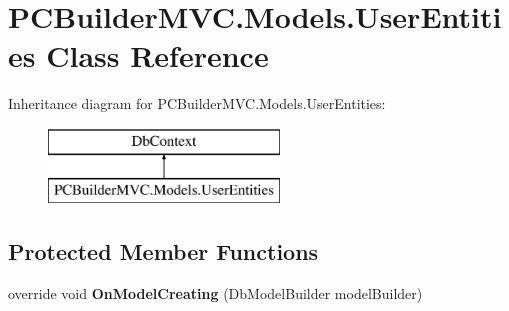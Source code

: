 \hypertarget{class_p_c_builder_m_v_c_1_1_models_1_1_user_entities}{}\section{P\+C\+Builder\+M\+V\+C.\+Models.\+User\+Entities Class Reference}
\label{class_p_c_builder_m_v_c_1_1_models_1_1_user_entities}
Inheritance diagram for P\+C\+Builder\+M\+V\+C.\+Models.\+User\+Entities\+:\begin{figure}[H]
\begin{center}
\leavevmode
\includegraphics[height=2.000000cm]{class_p_c_builder_m_v_c_1_1_models_1_1_user_entities}
\end{center}
\end{figure}
\subsection*{Protected Member Functions}
\begin{DoxyCompactItemize}
\item 
override void {\bfseries On\+Model\+Creating} (Db\+Model\+Builder model\+Builder)\hypertarget{class_p_c_builder_m_v_c_1_1_models_1_1_user_entities_a4e4635cfa93a11fe54575099f2394030}{}\label{class_p_c_builder_m_v_c_1_1_models_1_1_user_entities_a4e4635cfa93a11fe54575099f2394030}

\end{DoxyCompactItemize}
